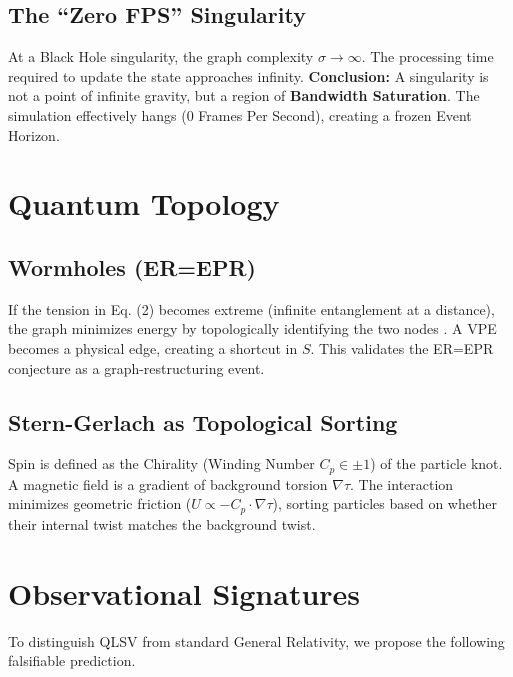 \documentclass[11pt, a4paper]{article}
\begin{document}
\subsection{The ``Zero FPS'' Singularity}
At a Black Hole singularity, the graph complexity $\sigma \to \infty$. The processing time required to update the state approaches infinity.
\textbf{Conclusion:} A singularity is not a point of infinite gravity, but a region of \textbf{Bandwidth Saturation}. The simulation effectively hangs (0 Frames Per Second), creating a frozen Event Horizon.

\section{Quantum Topology}

\subsection{Wormholes (ER=EPR)}
If the tension in Eq. (2) becomes extreme (infinite entanglement at a distance), the graph minimizes energy by topologically identifying the two nodes \cite{maldacena2013}. A VPE becomes a physical edge, creating a shortcut in $S$. This validates the ER=EPR conjecture as a graph-restructuring event.

\subsection{Stern-Gerlach as Topological Sorting}
Spin is defined as the Chirality (Winding Number $C_p \in \pm 1$) of the particle knot. A magnetic field is a gradient of background torsion $\nabla \tau$. The interaction minimizes geometric friction ($U \propto - C_p \cdot \nabla \tau$), sorting particles based on whether their internal twist matches the background twist.

\section{Observational Signatures}

To distinguish QLSV from standard General Relativity, we propose the following falsifiable prediction.
\end{document}
